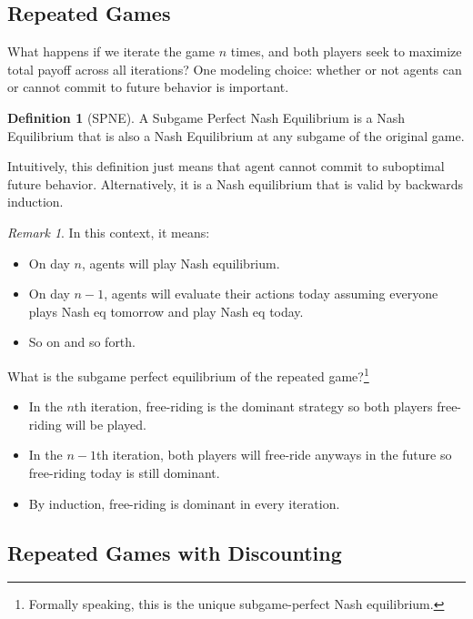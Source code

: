 \documentclass[dvipsnames]{article}
\theoremstyle{definition}
\newtheorem{definition}{Definition}[section]
\theoremstyle{remark}
\newtheorem*{remark}{Remark}
\begin{document}
\subsection{Repeated Games}

What happens if we iterate the game $n$ times, and both players seek to maximize total payoff across all iterations? One modeling choice: whether or not agents can or cannot commit to future behavior is important. 

\begin{definition}[SPNE]
	A Subgame Perfect Nash Equilibrium is a Nash Equilibrium that is also a Nash Equilibrium at any subgame of the original game. 
\end{definition}

Intuitively, this definition just means that agent cannot commit to suboptimal future behavior. Alternatively, it is a Nash equilibrium that is valid by backwards induction.

\begin{remark}
	In this context, it means:
	\begin{itemize}
		\item On day $n$, agents will play Nash equilibrium.
		\item On day $n-1$, agents will evaluate their actions today assuming everyone plays Nash eq tomorrow and play Nash eq today.
		\item So on and so forth. 
	\end{itemize}
\end{remark}

What is the subgame perfect equilibrium of the repeated game?\footnote{Formally speaking, this is the unique subgame-perfect Nash equilibrium.}
\begin{itemize}
	\item In the $n$th iteration, free-riding is the dominant strategy so both players free-riding will be played.
	\item In the $n-1$th iteration, both players will free-ride anyways in the future so free-riding today is still dominant. 
	\item By induction, free-riding is dominant in every iteration.
\end{itemize}

\subsection{Repeated Games with Discounting}
\end{document}
